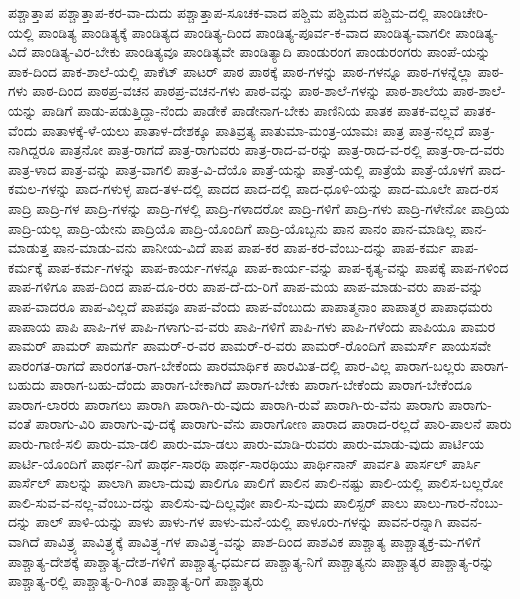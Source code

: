 {ಪಶ್ಚಾತ್ತಾಪ
ಪಶ್ಚಾತ್ತಾಪ-ಕರ-ವಾ-ದುದು
ಪಶ್ಚಾತ್ತಾಪ-ಸೂಚಕ-ವಾದ
ಪಶ್ಚಿಮ
ಪಶ್ಚಿಮದ
ಪಶ್ಚಿಮ-ದಲ್ಲಿ
ಪಾಂಡಿಚೇರಿ-ಯಲ್ಲಿ
ಪಾಂಡಿತ್ಯ
ಪಾಂಡಿತ್ಯಕ್ಕೆ
ಪಾಂಡಿತ್ಯದ
ಪಾಂಡಿತ್ಯ-ದಿಂದ
ಪಾಂಡಿತ್ಯ-ಪೂರ್ವ-ಕ-ವಾದ
ಪಾಂಡಿತ್ಯ-ವಾಗಲೀ
ಪಾಂಡಿತ್ಯ-ವಿದೆ
ಪಾಂಡಿತ್ಯ-ವಿರ-ಬೇಕು
ಪಾಂಡಿತ್ಯವೂ
ಪಾಂಡಿತ್ಯವೇ
ಪಾಂಡಿತ್ಯಾದಿ
ಪಾಂಡುರಂಗ
ಪಾಂಡುರಂಗರು
ಪಾಂಪೆ-ಯನ್ನು
ಪಾಕ-ದಿಂದ
ಪಾಕ-ಶಾಲೆ-ಯಲ್ಲಿ
ಪಾಕೆಟ್
ಪಾಟರ್
ಪಾಠ
ಪಾಠಕ್ಕೆ
ಪಾಠ-ಗಳನ್ನು
ಪಾಠ-ಗಳನ್ನೂ
ಪಾಠ-ಗಳನ್ನೆಲ್ಲಾ
ಪಾಠ-ಗಳು
ಪಾಠ-ದಿಂದ
ಪಾಠಪ್ರ-ವಚನ
ಪಾಠಪ್ರ-ವಚನ-ಗಳು
ಪಾಠ-ವನ್ನು
ಪಾಠ-ಶಾಲೆ-ಗಳನ್ನು
ಪಾಠ-ಶಾಲೆಯ
ಪಾಠ-ಶಾಲೆ-ಯನ್ನು
ಪಾಡಿಗೆ
ಪಾಡು-ಪಡುತ್ತಿದ್ದಾ-ನೆಂದು
ಪಾಡೇಕೆ
ಪಾಡೇನಾಗ-ಬೇಕು
ಪಾಣಿನಿಯ
ಪಾತಕ
ಪಾತಕ-ವಲ್ಲವೆ
ಪಾತಕ-ವೆಂದು
ಪಾತಾಳಕ್ಕೆ-ಳೆ-ಯಲು
ಪಾತಾಳ-ದೇಶಕ್ಕೂ
ಪಾತಿವ್ರತ್ಯ
ಪಾತುಮಾ-ಮಂತ್ರ-ಯಾಮಃ
ಪಾತ್ರ
ಪಾತ್ರ-ನಲ್ಲದೆ
ಪಾತ್ರ-ನಾಗಿದ್ದರೂ
ಪಾತ್ರನೋ
ಪಾತ್ರ-ರಾಗದೆ
ಪಾತ್ರ-ರಾಗುವರು
ಪಾತ್ರ-ರಾದ-ವ-ರನ್ನು
ಪಾತ್ರ-ರಾದ-ವ-ರಲ್ಲಿ
ಪಾತ್ರ-ರಾ-ದ-ವರು
ಪಾತ್ರ-ಳಾದ
ಪಾತ್ರ-ವನ್ನು
ಪಾತ್ರ-ವಾಗಲಿ
ಪಾತ್ರ-ವಿ-ದೆಯೊ
ಪಾತ್ರೆ-ಯನ್ನು
ಪಾತ್ರೆ-ಯಲ್ಲಿ
ಪಾತ್ರೆಯೆ
ಪಾತ್ರೆ-ಯೊಳಗೆ
ಪಾದ-ಕಮಲ-ಗಳನ್ನು
ಪಾದ-ಗಳುಳ್ಳ
ಪಾದ-ತಳ-ದಲ್ಲಿ
ಪಾದದ
ಪಾದ-ದಲ್ಲಿ
ಪಾದ-ಧೂಳಿ-ಯನ್ನು
ಪಾದ-ಮೂಲೇ
ಪಾದ-ರಸ
ಪಾದ್ರಿ
ಪಾದ್ರಿ-ಗಳ
ಪಾದ್ರಿ-ಗಳನ್ನು
ಪಾದ್ರಿ-ಗಳಲ್ಲಿ
ಪಾದ್ರಿ-ಗಳಾದರೋ
ಪಾದ್ರಿ-ಗಳಿಗೆ
ಪಾದ್ರಿ-ಗಳು
ಪಾದ್ರಿ-ಗಳೇನೋ
ಪಾದ್ರಿಯ
ಪಾದ್ರಿ-ಯಲ್ಲ
ಪಾದ್ರಿ-ಯೇನು
ಪಾದ್ರಿಯೊ
ಪಾದ್ರಿ-ಯೊಂದಿಗೆ
ಪಾದ್ರಿ-ಯೊಬ್ಬನು
ಪಾನ
ಪಾನಂ
ಪಾನ-ಮಾಡಿಲ್ಲ
ಪಾನ-ಮಾಡುತ್ತ
ಪಾನ-ಮಾಡು-ವನು
ಪಾನೀಯ-ವಿದೆ
ಪಾಪ
ಪಾಪ-ಕರ
ಪಾಪ-ಕರ-ವೆಂಬು-ದನ್ನು
ಪಾಪ-ಕರ್ಮ
ಪಾಪ-ಕರ್ಮಕ್ಕೆ
ಪಾಪ-ಕರ್ಮ-ಗಳನ್ನು
ಪಾಪ-ಕಾರ್ಯ-ಗಳನ್ನೂ
ಪಾಪ-ಕಾರ್ಯ-ವನ್ನು
ಪಾಪ-ಕೃತ್ಯ-ವನ್ನು
ಪಾಪಕ್ಕೆ
ಪಾಪ-ಗಳಿಂದ
ಪಾಪ-ಗಳಿಗೂ
ಪಾಪ-ದಿಂದ
ಪಾಪ-ದೂ-ರರು
ಪಾಪ-ದೆ-ದು-ರಿಗೆ
ಪಾಪ-ಮಯ
ಪಾಪ-ಮಾಡು-ವರು
ಪಾಪ-ವನ್ನು
ಪಾಪ-ವಾದರೂ
ಪಾಪ-ವಿಲ್ಲದೆ
ಪಾಪವೂ
ಪಾಪ-ವೆಂದು
ಪಾಪ-ವೆಂಬುದು
ಪಾಪಾತ್ಮನಾಂ
ಪಾಪಾತ್ಮರ
ಪಾಪಾಧಮರು
ಪಾಪಾಯ
ಪಾಪಿ
ಪಾಪಿ-ಗಳ
ಪಾಪಿ-ಗಳಾಗು-ವ-ವರು
ಪಾಪಿ-ಗಳಿಗೆ
ಪಾಪಿ-ಗಳು
ಪಾಪಿ-ಗಳೆಂದು
ಪಾಪಿಯೂ
ಪಾಮರ
ಪಾಮರ್
ಪಾಮರ್
ಪಾಮರ್ಗೆ
ಪಾಮರ್-ರ-ವರ
ಪಾಮರ್-ರ-ವರು
ಪಾಮರ್-ರೊಂದಿಗೆ
ಪಾಮರ್ಸ್
ಪಾಯಸವೇ
ಪಾರಂಗತ-ರಾಗದೆ
ಪಾರಂಗತ-ರಾಗ-ಬೇಕೆಂದು
ಪಾರಮಾರ್ಥಿಕ
ಪಾರಮಿತ-ದಲ್ಲಿ
ಪಾರ-ವಿಲ್ಲ
ಪಾರಾಗ-ಬಲ್ಲರು
ಪಾರಾಗ-ಬಹುದು
ಪಾರಾಗ-ಬಹು-ದೆಂದು
ಪಾರಾಗ-ಬೇಕಾಗಿದೆ
ಪಾರಾಗ-ಬೇಕು
ಪಾರಾಗ-ಬೇಕೆಂದು
ಪಾರಾಗ-ಬೇಕೆಂದೂ
ಪಾರಾಗ-ಲಾರರು
ಪಾರಾಗಲು
ಪಾರಾಗಿ
ಪಾರಾಗಿ-ರು-ವುದು
ಪಾರಾಗಿ-ರುವೆ
ಪಾರಾಗಿ-ರು-ವೆನು
ಪಾರಾಗು
ಪಾರಾಗು-ವಂತೆ
ಪಾರಾಗು-ವಿರಿ
ಪಾರಾಗು-ವು-ದಕ್ಕೆ
ಪಾರಾಗು-ವೆನು
ಪಾರಾಗೋಣ
ಪಾರಾದ
ಪಾರಾದ-ರಲ್ಲದೆ
ಪಾರಿ-ಪಾಲನೆ
ಪಾರು
ಪಾರು-ಗಾಣಿ-ಸಲಿ
ಪಾರು-ಮಾ-ಡಲಿ
ಪಾರು-ಮಾ-ಡಲು
ಪಾರು-ಮಾಡಿ-ರುವರು
ಪಾರು-ಮಾಡು-ವುದು
ಪಾರ್ಟಿಯ
ಪಾರ್ಟಿ-ಯೊಂದಿಗೆ
ಪಾರ್ಥ-ನಿಗೆ
ಪಾರ್ಥ-ಸಾರಥಿ
ಪಾರ್ಥ-ಸಾರಥಿಯು
ಪಾರ್ಥಿನಾನ್
ಪಾರ್ವತಿ
ಪಾರ್ಸಲ್
ಪಾರ್ಸಿ
ಪಾರ್ಸೆಲ್
ಪಾಲನ್ನು
ಪಾಲಾಗಿ
ಪಾಲಾ-ದುವು
ಪಾಲಿಗೂ
ಪಾಲಿಗೆ
ಪಾಲಿನ
ಪಾಲಿ-ನಷ್ಟು
ಪಾಲಿ-ಯಲ್ಲಿ
ಪಾಲಿಸ-ಬಲ್ಲರೋ
ಪಾಲಿ-ಸುವ-ವ-ನಲ್ಲ-ವೆಂಬು-ದನ್ನು
ಪಾಲಿಸು-ವು-ದಿಲ್ಲವೋ
ಪಾಲಿ-ಸು-ವುದು
ಪಾಲಿಸ್ಟರ್
ಪಾಲು
ಪಾಲು-ಗಾರ-ನೆಂಬು-ದನ್ನು
ಪಾಲ್
ಪಾಳಿ-ಯನ್ನು
ಪಾಳು
ಪಾಳು-ಗಳ
ಪಾಳು-ಮನೆ-ಯಲ್ಲಿ
ಪಾಳೂರು-ಗಳನ್ನು
ಪಾವನ-ರನ್ನಾಗಿ
ಪಾವನ-ವಾಗಿದೆ
ಪಾವಿತ್ರ್ಯ
ಪಾವಿತ್ರ್ಯಕ್ಕೆ
ಪಾವಿತ್ರ್ಯ-ಗಳ
ಪಾವಿತ್ರ್ಯ-ವನ್ನು
ಪಾಶ-ದಿಂದ
ಪಾಶವಿಕ
ಪಾಶ್ಚಾತ್ಯ
ಪಾಶ್ಚಾತ್ಯಕ್ರ-ಮ-ಗಳಿಗೆ
ಪಾಶ್ಚಾತ್ಯ-ದೇಶಕ್ಕೆ
ಪಾಶ್ಚಾತ್ಯ-ದೇಶ-ಗಳಿಗೆ
ಪಾಶ್ಚಾತ್ಯ-ಧರ್ಮದ
ಪಾಶ್ಚಾತ್ಯ-ನಿಗೆ
ಪಾಶ್ಚಾತ್ಯನು
ಪಾಶ್ಚಾತ್ಯರ
ಪಾಶ್ಚಾತ್ಯ-ರನ್ನು
ಪಾಶ್ಚಾತ್ಯ-ರಲ್ಲಿ
ಪಾಶ್ಚಾತ್ಯ-ರಿ-ಗಿಂತ
ಪಾಶ್ಚಾತ್ಯ-ರಿಗೆ
ಪಾಶ್ಚಾತ್ಯರು
}
